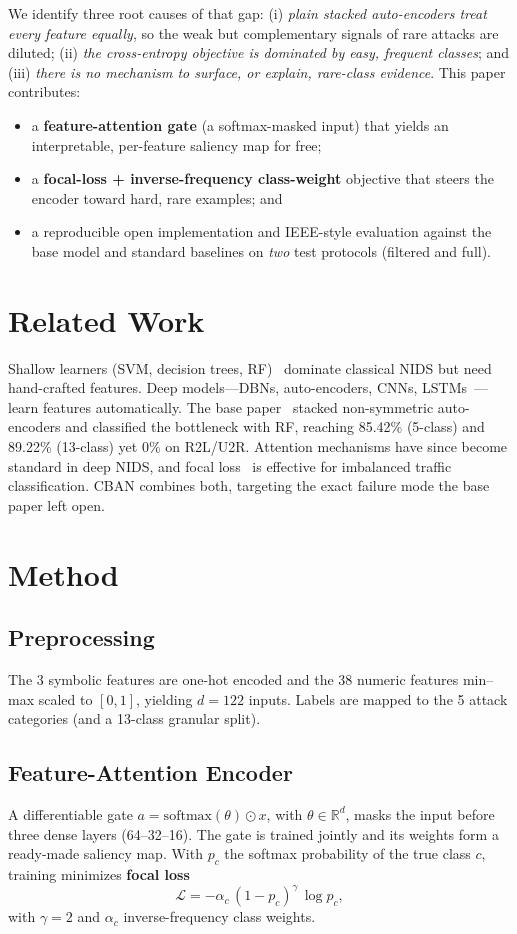 \documentclass[conference]{IEEEtran}
\begin{document}
We identify three root causes of that gap: (i) \emph{plain stacked
auto-encoders treat every feature equally}, so the weak but complementary
signals of rare attacks are diluted; (ii) \emph{the cross-entropy objective is
dominated by easy, frequent classes}; and (iii) \emph{there is no mechanism to
surface, or explain, rare-class evidence}. This paper contributes:

\begin{itemize}
\item a \textbf{feature-attention gate} (a softmax-masked input) that yields an
interpretable, per-feature saliency map for free;
\item a \textbf{focal-loss + inverse-frequency class-weight} objective that
steers the encoder toward hard, rare examples; and
\item a reproducible open implementation and IEEE-style evaluation against the
base model and standard baselines on \emph{two} test protocols (filtered and
full).
\end{itemize}

\section{Related Work}
Shallow learners (SVM, decision trees, RF)~\cite{choudhury2015} dominate
classical NIDS but need hand-crafted features. Deep models---DBNs,
auto-encoders, CNNs, LSTMs~\cite{yin2017,javaid2016}---learn features
automatically. The base paper~\cite{shone2018} stacked non-symmetric
auto-encoders and classified the bottleneck with RF, reaching 85.42\% (5-class)
and 89.22\% (13-class) yet 0\% on R2L/U2R. Attention mechanisms have since
become standard in deep NIDS, and focal loss~\cite{lin2017} is effective for
imbalanced traffic classification. CBAN combines both, targeting the exact
failure mode the base paper left open.

\section{Method}
\subsection{Preprocessing}
The 3 symbolic features are one-hot encoded and the 38 numeric features
min--max scaled to $[0,1]$, yielding $d=122$ inputs. Labels are mapped to the 5
attack categories (and a 13-class granular split).

\subsection{Feature-Attention Encoder}
A differentiable gate $a = \mathrm{softmax}(\theta) \odot x$, with
$\theta \in \mathbb{R}^d$, masks the input before three dense layers
(64--32--16). The gate is trained jointly and its weights form a ready-made
saliency map. With $p_c$ the softmax probability of the true class $c$,
training minimizes \textbf{focal loss}
\begin{equation}
\mathcal{L} = -\alpha_c\,(1-p_c)^{\gamma}\,\log p_c,
\end{equation}
with $\gamma=2$ and $\alpha_c$ inverse-frequency class weights.
\end{document}
